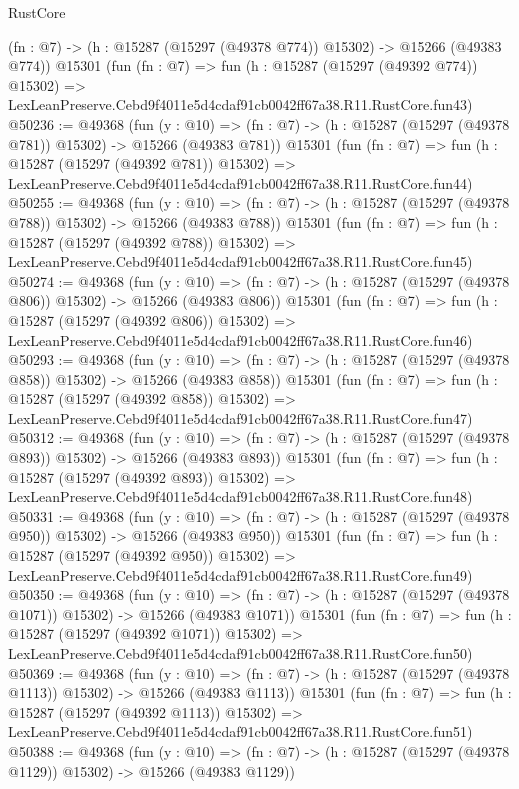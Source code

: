 \begin{lexlean}{RustCore}
\begin{coremodule}
    (fn : @7) -> (h : @15287 (@15297 (@49378 @774)) @15302) -> @15266 (@49383 @774))
    @15301
    (fun (fn : @7) =>
    fun (h : @15287 (@15297 (@49392 @774)) @15302) =>
    LexLeanPreserve.Cebd9f4011e5d4cdaf91cb0042ff67a38.R11.RustCore.fun43)
@50236 := @49368
    (fun (y : @10) =>
    (fn : @7) -> (h : @15287 (@15297 (@49378 @781)) @15302) -> @15266 (@49383 @781))
    @15301
    (fun (fn : @7) =>
    fun (h : @15287 (@15297 (@49392 @781)) @15302) =>
    LexLeanPreserve.Cebd9f4011e5d4cdaf91cb0042ff67a38.R11.RustCore.fun44)
@50255 := @49368
    (fun (y : @10) =>
    (fn : @7) -> (h : @15287 (@15297 (@49378 @788)) @15302) -> @15266 (@49383 @788))
    @15301
    (fun (fn : @7) =>
    fun (h : @15287 (@15297 (@49392 @788)) @15302) =>
    LexLeanPreserve.Cebd9f4011e5d4cdaf91cb0042ff67a38.R11.RustCore.fun45)
@50274 := @49368
    (fun (y : @10) =>
    (fn : @7) -> (h : @15287 (@15297 (@49378 @806)) @15302) -> @15266 (@49383 @806))
    @15301
    (fun (fn : @7) =>
    fun (h : @15287 (@15297 (@49392 @806)) @15302) =>
    LexLeanPreserve.Cebd9f4011e5d4cdaf91cb0042ff67a38.R11.RustCore.fun46)
@50293 := @49368
    (fun (y : @10) =>
    (fn : @7) -> (h : @15287 (@15297 (@49378 @858)) @15302) -> @15266 (@49383 @858))
    @15301
    (fun (fn : @7) =>
    fun (h : @15287 (@15297 (@49392 @858)) @15302) =>
    LexLeanPreserve.Cebd9f4011e5d4cdaf91cb0042ff67a38.R11.RustCore.fun47)
@50312 := @49368
    (fun (y : @10) =>
    (fn : @7) -> (h : @15287 (@15297 (@49378 @893)) @15302) -> @15266 (@49383 @893))
    @15301
    (fun (fn : @7) =>
    fun (h : @15287 (@15297 (@49392 @893)) @15302) =>
    LexLeanPreserve.Cebd9f4011e5d4cdaf91cb0042ff67a38.R11.RustCore.fun48)
@50331 := @49368
    (fun (y : @10) =>
    (fn : @7) -> (h : @15287 (@15297 (@49378 @950)) @15302) -> @15266 (@49383 @950))
    @15301
    (fun (fn : @7) =>
    fun (h : @15287 (@15297 (@49392 @950)) @15302) =>
    LexLeanPreserve.Cebd9f4011e5d4cdaf91cb0042ff67a38.R11.RustCore.fun49)
@50350 := @49368
    (fun (y : @10) =>
    (fn : @7) -> (h : @15287 (@15297 (@49378 @1071)) @15302) -> @15266 (@49383 @1071))
    @15301
    (fun (fn : @7) =>
    fun (h : @15287 (@15297 (@49392 @1071)) @15302) =>
    LexLeanPreserve.Cebd9f4011e5d4cdaf91cb0042ff67a38.R11.RustCore.fun50)
@50369 := @49368
    (fun (y : @10) =>
    (fn : @7) -> (h : @15287 (@15297 (@49378 @1113)) @15302) -> @15266 (@49383 @1113))
    @15301
    (fun (fn : @7) =>
    fun (h : @15287 (@15297 (@49392 @1113)) @15302) =>
    LexLeanPreserve.Cebd9f4011e5d4cdaf91cb0042ff67a38.R11.RustCore.fun51)
@50388 := @49368
    (fun (y : @10) =>
    (fn : @7) -> (h : @15287 (@15297 (@49378 @1129)) @15302) -> @15266 (@49383 @1129))

\end{coremodule}
\end{lexlean}
